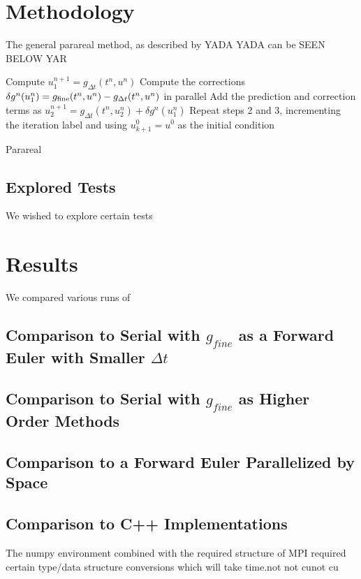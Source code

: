 \documentclass[letterpaper,twocolumn,11pt]{article}
\begin{document}
\section{Methodology}

The general parareal method, as described by YADA YADA can be SEEN BELOW YAR

\begin{algorithm}[t]
    Compute $u_1^{n+1} = g_{\Delta t}(t^n, u^n)$\;
    Compute the corrections $\delta g^n(u_1^n) = g_{\textnormal{fine}}(t^n,
    u^n) - g_{\Delta t}(t^n, u^n)$ in parallel\;
    Add the prediction and correction terms as $u_2^{n+1} = g_{\Delta
    t}(t^n, u_2^n) + \delta g^n(u_1^n)$\;
    Repeat steps 2 and 3, incrementing the iteration label and using $u_{k+1}^0
    = u^0$ as the initial condition\
 \caption{Parareal}
 \label{alg:parareal}
\end{algorithm}

\subsection{Explored Tests}
We wished to explore certain tests

\section{Results}
We compared various runs of 

\subsection{Comparison to Serial with $g_{fine}$ as a Forward Euler with
Smaller $\Delta t$}

\subsection{Comparison to Serial with $g_{fine}$ as Higher Order Methods}

\subsection{Comparison to a Forward Euler Parallelized by Space}

\subsection{Comparison to C++ Implementations}
    The numpy environment combined with the required structure of MPI required
    certain type/data structure conversions which will take time.not not cunot
    cu
\end{document}
